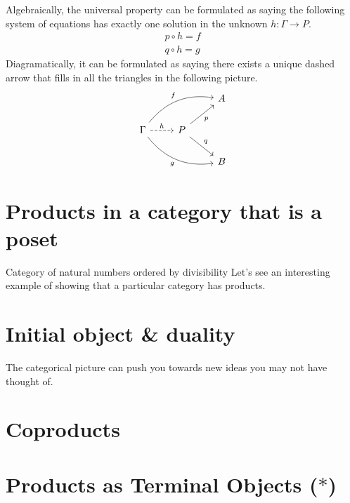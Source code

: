 Algebraically, the universal property can be formulated as saying
  the following system of equations has exactly one solution
  in the unknown \(h : \Gamma \to P\).
  \begin{align}
    p \circ h = f \\
    q \circ h = g
  \end{align}
Diagramatically, it can be formulated as saying there exists a unique
dashed arrow that fills in all the triangles in the following picture.
\begin{equation}
\begin{tikzcd}
                                                                                        &                                    & A \\
\Gamma \arrow[rru, "f", bend left] \arrow[r, "h", dashed] \arrow[rrd, "g"', bend right] & P \arrow[ru, "p"'] \arrow[rd, "q"] &   \\
                                                                                        &                                    & B
\end{tikzcd}
\end{equation}

\section{Products in a category that is a poset}
Category of natural numbers ordered by divisibility 
Let's see an interesting example of showing that a particular category has 
products.

\section{Initial object \& duality}
The categorical picture can push you towards new ideas you may not have thought of.

\section{Coproducts}

\section{Products as Terminal Objects ($*$)}

